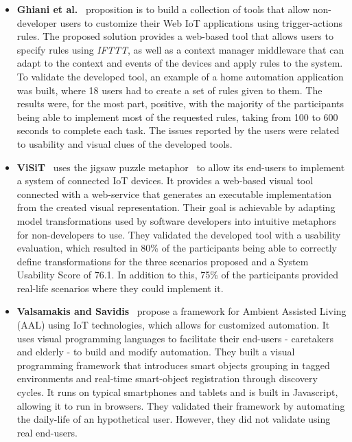 \begin{itemize}
\item\textbf{Ghiani et al.}~\cite{personalization_of_context_dependent_apps} proposition is to build a collection of tools that allow non-developer users to customize their Web IoT applications using trigger-actions rules. The proposed solution provides a web-based tool that allows users to specify rules using \textit{IFTTT}, as well as a context manager middleware that can adapt to the context and events of the devices and apply rules to the system. To validate the developed tool, an example of a home automation application was built, where 18 users had to create a set of rules given to them. The results were, for the most part, positive, with the majority of the participants being able to implement most of the requested rules, taking from 100 to 600 seconds to complete each task. The issues reported by the users were related to usability and visual clues of the developed tools.

\item\textbf{ViSiT}~\cite{visit} uses the jigsaw puzzle metaphor~\cite{jigsaw03} to allow its end-users to implement a system of connected IoT devices. It provides a web-based visual tool connected with a web-service that generates an executable implementation from the created visual representation. Their goal is achievable by adapting model transformations used by software developers into intuitive metaphors for non-developers to use. They validated the developed tool with a usability evaluation, which resulted in 80\% of the participants being able to correctly define transformations for the three scenarios proposed and a System Usability Score of 76.1. In addition to this, 75\% of the participants provided real-life scenarios where they could implement it.

\item\textbf{Valsamakis and Savidis}~\cite{Valsamakis2017} propose a framework for Ambient Assisted Living (AAL) using IoT technologies, which allows for customized automation. It uses visual programming languages to facilitate their end-users - caretakers and elderly - to build and modify automation. They built a visual programming framework that introduces smart objects grouping in tagged environments and real-time smart-object registration through discovery cycles. It runs on typical smartphones and tablets and is built in Javascript, allowing it to run in browsers. They validated their framework by automating the daily-life of an hypothetical user. However, they did not validate using real end-users.


\end{itemize}
